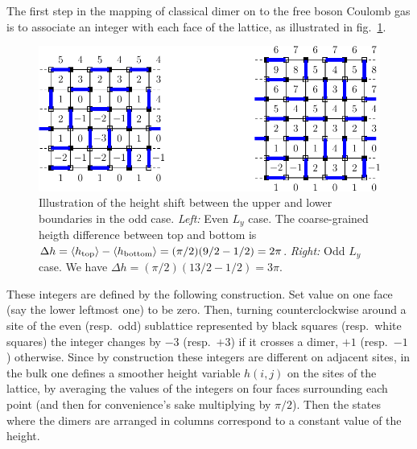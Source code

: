 \documentclass[11pt]{iopart}
\begin{document}
The first step in the mapping of classical dimer on to the free boson Coulomb gas is to associate an integer with each face of the lattice, as illustrated in fig.\ \ref{fig:height_shift}.
\begin{figure}[ht]
 \begin{center}
 \includegraphics[scale=0.8]{./figures/shift.pdf}
 \end{center}
\caption{Illustration of the height shift between the upper and lower boundaries in the odd case.  \emph{Left:} Even $L_y$ case. The coarse-grained heigth difference between top and bottom is $\Delta h=\langle h_{\rm top}\rangle-\langle h_{\rm bottom}\rangle=(\pi/2)(9/2-1/2)=2\pi$.  \emph{Right:} Odd $L_y$ case. We have $\Delta h=(\pi/2)(13/2-1/2)=3\pi$.}
\label{fig:height_shift}
\end{figure}
These integers are defined by the following construction. Set value on one face (say the lower leftmost one) to be zero. Then, turning counterclockwise around a site of the even (resp.\ odd) sublattice represented by black squares (resp.\ white squares) the integer changes by $-3$ (resp.\ $+3$) if it crosses a dimer, $+1$ (resp.\ $-1$) otherwise. Since by construction these integers are different on adjacent sites, in the bulk one defines a smoother height variable $h(i,j)$ on the sites of the lattice, by averaging the values of the integers on four faces surrounding each point (and then for convenience's sake multiplying by $\pi/2$). Then the states where the dimers are arranged in columns correspond to a constant value of the height.
\end{document}
